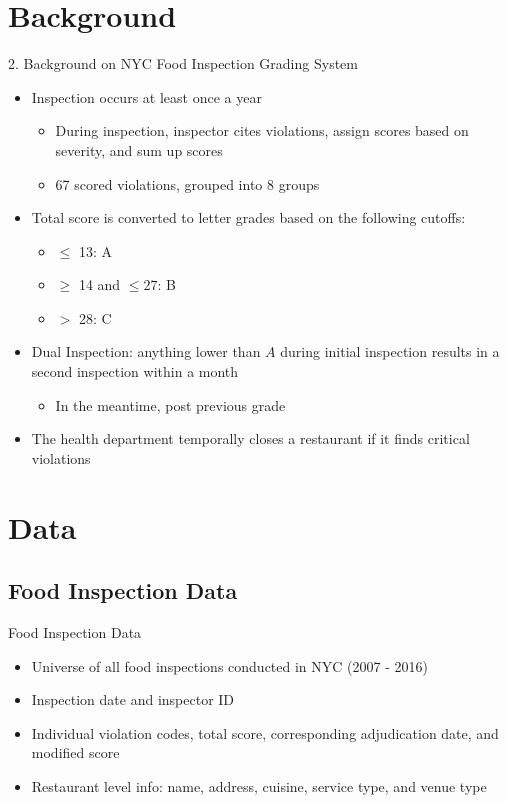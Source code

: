 \documentclass{beamer}
\begin{document}
\section{Background}
\begin{frame}{2. Background on NYC Food Inspection Grading System}
\begin{itemize}
    \pause
    \item Inspection occurs at least once a year
    \begin{itemize}
    \item During inspection, inspector cites violations, assign scores based on severity, and sum up scores
    \item 67 scored violations, grouped into 8 groups
    \end{itemize}
    \pause
    \item Total score is converted to letter grades based on the following cutoffs:
    \begin{itemize}
    \item $\leq$ 13: A
    \item $\geq$ 14 and $\leq 27$: B 
    \item $>$ 28: C
    \end{itemize}
    \pause
    \item Dual Inspection: anything lower than $A$ during initial inspection results in a second inspection within a month
    \begin{itemize}
        \item In the meantime, post previous grade
    \end{itemize}
    \pause
    \item The health department temporally closes a restaurant if it finds critical violations 
\end{itemize}
\end{frame}

\section{Data}
\subsection{Food Inspection Data}
\begin{frame}{Food Inspection Data}
\begin{itemize}
\item Universe of all food inspections conducted in NYC (2007 - 2016) 
\item Inspection date and inspector ID
\item Individual violation codes, total score, corresponding adjudication date, and modified score  
\item Restaurant level info: name, address, cuisine, service type, and venue type
\end{itemize}
\end{frame}
\end{document}
